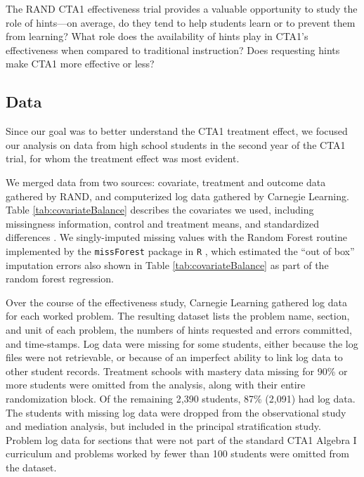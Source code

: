 \documentclass{article}
\begin{document}
The RAND CTA1 effectiveness trial provides a valuable opportunity to
study the role of hints---on average, do they tend to help students
learn or to prevent them from learning?
What role does the availability of hints play in CTA1's effectiveness
when compared to traditional instruction?
Does requesting hints make CTA1 more effective or less?

\subsection{Data}\label{sec:data}

Since our goal was to better understand the CTA1
treatment effect, we focused our analysis on data from high school students in
the second year of the CTA1 trial, for whom the treatment effect was
most evident.

We merged data from two sources: covariate, treatment and outcome data gathered by RAND, and computerized log data gathered by Carnegie Learning.
Table \ref{tab:covariateBalance} describes the covariates we used, including
missingness information, control and treatment means, and standardized
differences \citep[c.f.][]{kalton1968standardization}.
We singly-imputed missing values with the Random Forest routine implemented
by the \texttt{missForest} package in \texttt{R}
\citep{missForest,rcite},  which estimated the ``out of box'' imputation
errors also shown in Table \ref{tab:covariateBalance} as part of the random forest regression.

\begin{table}[ht]
\centering

\caption{Missingness information and balance for the covariates included in this study, from
  the CTA1 Effectiveness experiment, high
  school, year two. Imputation error is percent falsely classified for
  categorical variables (Race/Ethnicity, Sex, and Special Education)
  and standardized root mean squared error for Pretest, which is
  continuous. %
  Analysis done in \texttt{R} via \texttt{RItools} \citep{ritools}.}
\label{tab:covariateBalance}
\end{table}


Over the course of the effectiveness study, Carnegie Learning gathered
log data for each worked problem.
The resulting dataset lists the problem name, section, and unit of
each problem, the numbers of hints requested and errors committed, and time-stamps.
Log data were missing for some students, either because the log files were not retrievable, or because of an imperfect ability to link log data to other student records.
Treatment schools with mastery data missing
for 90\% or more students were omitted from the analysis, along with
their entire randomization block.
Of the remaining 2,390 students, 87\% (2,091) had log
data.
The students with missing log data were dropped from the observational
study and mediation analysis, but included in the principal
stratification study.
Problem log data for sections that were not part of the
standard CTA1 Algebra I curriculum and problems worked by fewer than 100
students were omitted from the
dataset.
\end{document}
